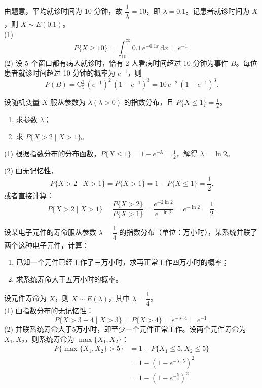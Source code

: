 ﻿\documentclass[lang=cn,11pt]{elegantbook}
\begin{document}
\begin{solution}
由题意，平均就诊时间为 10 分钟，故 $\dfrac{1}{\lambda}=10$，即 $\lambda=0.1$。记患者就诊时间为 $X$，则 $X \sim E(0.1)$。\\
(1) 
\[
P\{X \ge 10\} = \int_{10}^{\infty} 0.1\, e^{-0.1x}\,\mathrm{d}x = e^{-1}.
\]
(2) 设 5 个窗口都有病人就诊时，恰有 2 人看病时间超过 10 分钟为事件 $B$。每位患者就诊时间超过 10 分钟的概率为 $e^{-1}$，则
\[
P(B) = \mathrm{C}_5^2\, (e^{-1})^2\, (1-e^{-1})^3 = 10\, e^{-2}\,(1-e^{-1})^3.
\]
\end{solution}

\begin{exercise}\label{exer:2-10}
设随机变量 $X$ 服从参数为 $\lambda(\lambda>0)$ 的指数分布，且 $P\{X \le 1\} = \frac{1}{2}$。
\begin{enumerate}
    \item[(1)] 求参数 $\lambda$；
    \item[(2)] 求 $P\{X > 2 \mid X > 1\}$。
\end{enumerate}
\end{exercise}
\begin{solution}
(1) 根据指数分布的分布函数，$P\{X \le 1\} = 1 - e^{-\lambda} = \frac{1}{2}$，解得 $\lambda = \ln 2$。

(2) 由无记忆性，
\[
P\{X > 2 \mid X > 1\} = P\{X > 1\} = 1 - P\{X \le 1\} = \frac{1}{2}.
\]
或者直接计算：
\[
P\{X > 2 \mid X > 1\} = \frac{P\{X > 2\}}{P\{X > 1\}} = \frac{e^{-2\ln 2}}{e^{-\ln 2}} = e^{-\ln 2} = \frac{1}{2}.
\]
\end{solution}

\begin{exercise}[（指数分布无记忆性应用）]
设某电子元件的寿命服从参数 $\lambda=\dfrac{1}{4}$ 的指数分布（单位：万小时），某系统并联了两个这种电子元件，计算：
\begin{enumerate}
    \item[(1)] 已知一个元件已经工作了三万小时，求再正常工作四万小时的概率；
    \item[(2)] 求系统寿命大于五万小时的概率。
\end{enumerate}
\end{exercise}
\begin{solution}
设元件寿命为 $X$，则 $X\sim E(\lambda)$，其中 $\lambda=\dfrac{1}{4}$。\\
(1) 由指数分布的无记忆性：
\[
P\{X>3+4 \mid X>3\} = P\{X>4\} = e^{-\lambda\cdot4} = e^{-1}.
\]
(2) 并联系统寿命大于5万小时，即至少一个元件正常工作。设两个元件寿命为 $X_1, X_2$，则系统寿命为 $\max\{X_1,X_2\}$：
\[
\begin{aligned}
P\{\max\{X_1,X_2\}>5\} &= 1-P\{X_1\leqslant5, X_2\leqslant5\} \\
&= 1-\left(1-e^{-\lambda\cdot5}\right)^2 \\
&= 1-\left(1-e^{-\frac{5}{4}}\right)^2.
\end{aligned}
\]
\end{solution}
\end{document}
